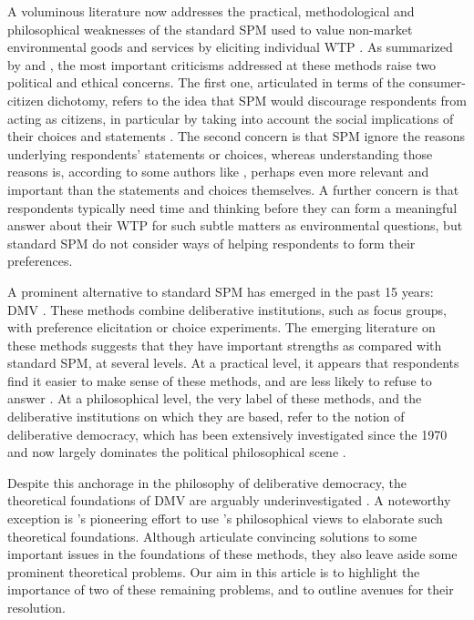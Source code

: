 \documentclass[version=3.21, pagesize, twoside=off, bibliography=totoc, DIV=calc, fontsize=12pt, a4paper, french, english]{scrartcl}
\begin{document}
A voluminous literature now addresses the practical, methodological and philosophical weaknesses of the standard \ac{SPM} used to value non-market environmental goods and services by eliciting individual \ac{WTP} \citep{meinard_ethical_2016}. 
As summarized by \cite{bartkowski_beyond_2018} and \cite{bartkowski_deliberative_2019}, the most important criticisms addressed at these methods raise two political and ethical concerns. 
The first one, articulated in terms of the consumer-citizen dichotomy, refers to the idea that \ac{SPM} would discourage respondents from acting as citizens, in particular by taking into account the social implications of their  choices and statements \citep{soma_representing_2014, vatn_institutional_2009}. 
The second concern is that \ac{SPM} ignore the reasons underlying respondents’ statements or choices, whereas understanding those reasons is, according to some authors like \citet{sen_environmental_1995}, perhaps even more relevant and important than the statements and choices themselves. A further concern is that respondents typically need time and thinking before they can form a meaningful answer about their \ac{WTP} for such subtle matters as environmental questions, but standard \ac{SPM} do not consider ways of helping respondents to form their preferences.

A prominent alternative to standard \ac{SPM} has emerged in the past 15 years: \ac{DMV} \citep{spash_deliberative_2007,bartkowski_economic_2017}. 
These methods combine deliberative institutions, such as focus groups, with preference elicitation or choice experiments. 
The emerging literature on these methods suggests that they have important strengths as compared with standard \ac{SPM}, at several levels. 
At a practical level, it appears that respondents find it easier to make sense of these methods, and are less likely to refuse to answer \citep{lienhoop_contingent_2007,szabo_reducing_2011}. 
At a philosophical level, the very label of these methods, and the deliberative institutions on which they are based, refer to the notion of deliberative democracy, which has been extensively investigated since the 1970 and now largely dominates the political philosophical scene \citep{chappell_deliberative_2012}.

Despite this anchorage in the philosophy of deliberative democracy, the theoretical foundations of \ac{DMV} are arguably underinvestigated \citep{bartkowski_economic_2017,bartkowski_beyond_2018,bunse_what_2015,kenter_what_2015}. 
A noteworthy exception is \citet{bartkowski_beyond_2018}’s pioneering effort to use \citet{sen_idea_2009}’s philosophical views to elaborate such theoretical foundations. 
Although \citet{bartkowski_beyond_2018} articulate convincing solutions to some important issues in the foundations of these methods, they also leave aside some prominent theoretical problems. 
Our aim in this article is to highlight the importance of two of these remaining problems, and to outline avenues for their resolution.
\end{document}
